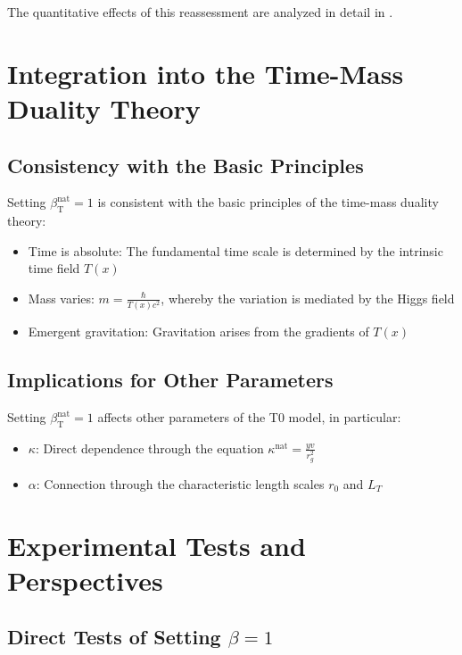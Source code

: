 \documentclass[12pt,a4paper]{article}
\newcommand{\Tfield}{T(x)}
\newcommand{\betaT}{\beta_{\text{T}}}
\begin{document}
	The quantitative effects of this reassessment are analyzed in detail in \cite{pascher_alphabeta_2025}.
	
	\section{Integration into the Time-Mass Duality Theory}
	
	\subsection{Consistency with the Basic Principles}
	
	Setting \(\betaT^{\text{nat}} = 1\) is consistent with the basic principles of the time-mass duality theory:
	\begin{itemize}
		\item Time is absolute: The fundamental time scale is determined by the intrinsic time field \(\Tfield\)
		\item Mass varies: \(m = \frac{\hbar}{\Tfield c^2}\), whereby the variation is mediated by the Higgs field
		\item Emergent gravitation: Gravitation arises from the gradients of \(\Tfield\)
	\end{itemize}
	
	\subsection{Implications for Other Parameters}
	
	Setting \(\betaT^{\text{nat}} = 1\) affects other parameters of the T0 model, in particular:
	\begin{itemize}
		\item \(\kappa\): Direct dependence through the equation \(\kappa^{\text{nat}} = \frac{y v}{r_g^2}\)
		\item \(\alpha\): Connection through the characteristic length scales \(r_0\) and \(L_T\)
	\end{itemize}
	
	\section{Experimental Tests and Perspectives}
	
	\subsection{Direct Tests of Setting \(\beta = 1\)}
	
\end{document}
